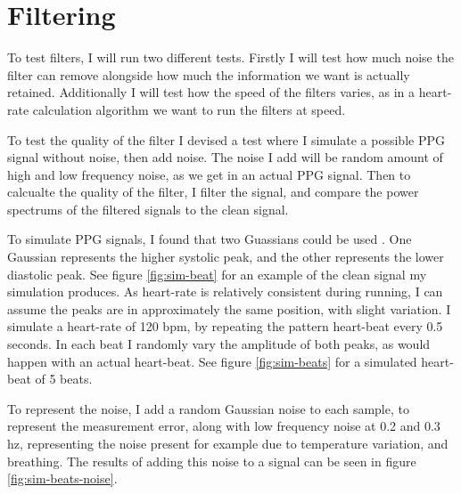\documentclass[12pt,a4paper,twoside,openright]{report}
\begin{document}
\section{Filtering}

To test filters, I will run two different tests. Firstly I will test how much
noise the filter can remove alongside how much the information we want is
actually retained. Additionally
I will test how the speed of the filters
varies, as in a heart-rate calculation algorithm we want to run the filters at
speed.

To test the quality of the filter I devised a test where I simulate a possible
PPG signal without noise, then add noise. The noise I add will be random
amount of high and low frequency noise, as we get in an actual PPG signal.
Then to calcualte the quality of the filter, I filter the signal, and compare
the power spectrums of the filtered signals to the clean signal.

To simulate PPG signals, I found that two Guassians could be used
\cite{Banerjee15}. One Gaussian represents the higher systolic peak, and the
other represents the lower diastolic peak. 
See figure \ref{fig:sim-beat} for an example of the clean signal my simulation
produces. As heart-rate is relatively
consistent during running, I can assume the peaks are in approximately the
same position, with slight variation. I simulate a heart-rate of 120 bpm, by
repeating the pattern heart-beat every 0.5 seconds. In each beat I randomly
vary the amplitude of both peaks, as would happen with an actual heart-beat.
See figure \ref{fig:sim-beats} for a simulated heart-beat of 5 beats.

To represent the noise, I add a random Gaussian noise to each sample, to
represent the measurement error, along with low frequency noise at 0.2 and 0.3
hz, representing the noise present for example due to temperature variation,
and breathing.  
The results of adding this noise to a signal can be seen in figure
\ref{fig:sim-beats-noise}.
\end{document}
